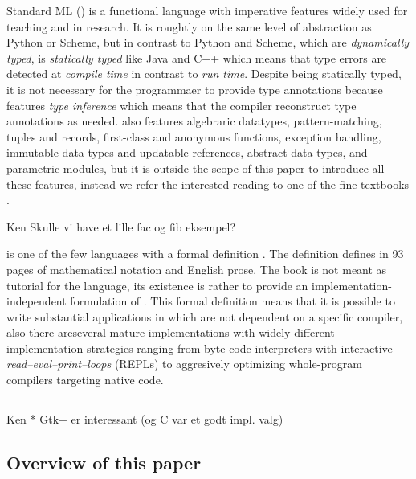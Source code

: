 \documentclass[workingdraft,endnotes]{usetex-v1}
\begin{document}
Standard ML (\sml) is a functional language with imperative features
widely used for teaching and in research.  It is roughtly on the same
level of abstraction as Python or Scheme, but in contrast to Python
and Scheme, which are \emph{dynamically typed}, is \sml
\emph{statically typed} like Java and C++ which means that type errors
are detected at \emph{compile time} in contrast to \emph{run time}.
Despite \sml being statically typed, it is not necessary for the
programmaer to provide type annotations because \sml features
\emph{type inference} which means that the compiler reconstruct type
annotations as needed.  \sml also features algebraric datatypes,
pattern-matching, tuples and records, first-class and anonymous
functions, exception handling, immutable data types and updatable
references, abstract data types, and parametric modules, but it is
outside the scope of this paper to introduce all these features,
instead we refer the interested reading to one of the fine textbooks
\cite{Hansen-Rischel:1999,Paulson:1996}.

\begin{ednote}{Ken}
  Skulle vi have et lille fac og fib eksempel?
\end{ednote}

\sml is one of the few languages with a formal definition
\cite{Milner:1997:Definition}.  The definition defines \sml in 93
pages of mathematical notation and English prose.  The book is not
meant as tutorial for the language, its existence is rather to provide
an implementation-independent formulation of \sml.  This formal
definition means that it is possible to write substantial applications
in \sml which are not dependent on a specific compiler, also there
areseveral mature \sml implementations with widely different
implementation strategies ranging from byte-code interpreters with
interactive \emph{read--eval--print--loops} (REPLs) to aggresively
optimizing whole-program compilers targeting native code.



\subsection{\gtk}
\label{sec:gtk}


\begin{ednote}{Ken}
  * Gtk+ er interessant (og C var et godt
    impl. valg)  
\end{ednote}
  

\subsection{Overview of this paper}
\label{sec:overview-this-paper}
\end{document}
